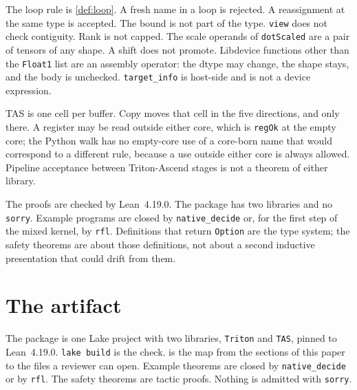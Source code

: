 \documentclass[a4paper,UKenglish,anonymous,cleveref,autoref]{lipics-v2021}
\begin{document}
The loop rule is \cref{def:loop}.
A fresh name in a loop is rejected.
A reassignment at the same type is accepted.
The bound is not part of the type.
\texttt{view} does not check contiguity.
Rank is not capped.
The scale operands of \texttt{dotScaled} are a pair of tensors of any shape.
A shift does not promote.
Libdevice functions other than the \texttt{Float1} list are an assembly operator: the dtype may change, the shape stays, and the body is unchecked.
\texttt{target\_info} is host-side and is not a device expression.

TAS is one cell per buffer.
Copy moves that cell in the five directions, and only there.
A register may be read outside either core, which is \texttt{regOk} at the empty core; the Python walk has no empty-core use of a core-born name that would correspond to a different rule, because a use outside either core is always allowed.
Pipeline acceptance between Triton-Ascend stages is not a theorem of either library.

The proofs are checked by Lean~4.19.0.
The package has two libraries and no \texttt{sorry}.
Example programs are closed by \texttt{native\_decide} or, for the first step of the mixed kernel, by \texttt{rfl}.
Definitions that return \texttt{Option} are the type system; the safety theorems are about those definitions, not about a second inductive presentation that could drift from them.

\section{The artifact}
\label{sec:artifact}

The package is one Lake project with two libraries, \texttt{Triton} and \texttt{TAS}, pinned to Lean~4.19.0.
\texttt{lake build} is the check.
 is the map from the sections of this paper to the files a reviewer can open.
Example theorems are closed by \texttt{native\_decide} or by \texttt{rfl}.
The safety theorems are tactic proofs.
Nothing is admitted with \texttt{sorry}.
\end{document}
